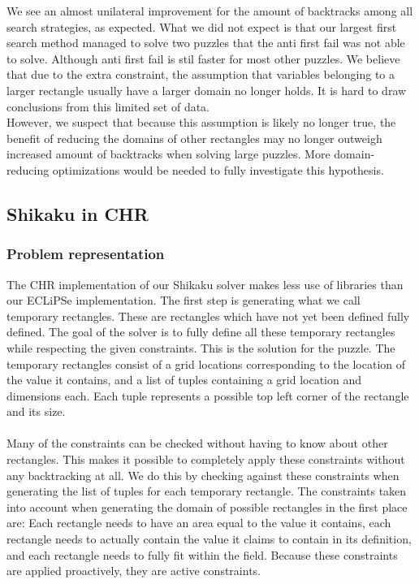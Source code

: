 We see an almost unilateral improvement for the amount of backtracks among all search strategies, as expected. What we did not expect is that our largest first search method managed to solve  two puzzles that the anti first fail was not able to solve. Although anti first fail is stil faster for most other puzzles. We believe that due to the extra constraint, the assumption that variables belonging to a larger rectangle usually have a larger domain no longer holds. It is hard to draw conclusions from this limited set of data. \\
However, we suspect that because this assumption is likely no longer true, the benefit of reducing the domains of other rectangles may no longer outweigh increased amount of backtracks when solving large puzzles. More domain-reducing optimizations would be needed to fully investigate this hypothesis. 

\subsection{Shikaku in CHR}
\subsubsection{Problem representation}
The CHR implementation of our Shikaku solver makes less use of libraries than our ECLiPSe implementation. The first step is generating what we call temporary rectangles. These are rectangles which have not yet been defined fully defined. The goal of the solver is to fully define all these temporary rectangles while respecting the given constraints. This is the solution for the puzzle. The temporary rectangles consist of a grid locations corresponding to the location of the value it contains, and a list of tuples containing a grid location and dimensions each. Each tuple represents a possible top left corner of the rectangle and its size. 
\\ \\
Many of the constraints can be checked without having to know about other rectangles. This makes it possible to completely apply these constraints without any backtracking at all. We do this by checking against these constraints when generating the list of tuples for each temporary rectangle. The constraints taken into account when generating the domain of possible rectangles in the first place are: Each rectangle needs to have an area equal to the value it contains, each rectangle needs to actually contain the value it claims to contain in its definition, and each rectangle needs to fully fit within the field. Because these constraints are applied proactively, they are active constraints.

